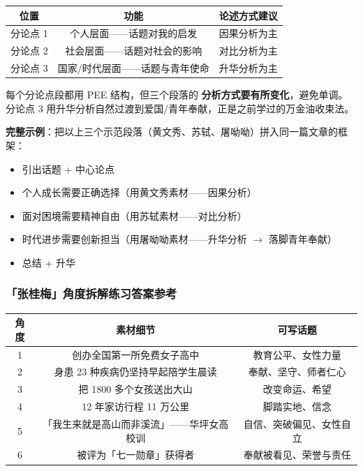 \begin{center}
\begin{tabular}{c|c|c}
\textbf{位置} & \textbf{功能} & \textbf{论述方式建议} \\ \hline
分论点 1 & 个人层面——话题对我的启发 & 因果分析为主 \\
分论点 2 & 社会层面——话题对社会的影响 & 对比分析为主 \\
分论点 3 & 国家/时代层面——话题与青年使命 & 升华分析为主 \\
\end{tabular}
\end{center}

每个分论点段都用 PEE 结构，但三个段落的 \textbf{分析方式要有所变化}，避免单调。分论点 3 用升华分析自然过渡到爱国/青年奉献，正是之前学过的万金油收束法。

\textbf{完整示例}：把以上三个示范段落（黄文秀、苏轼、屠呦呦）拼入同一篇文章的框架：

\begin{itemize}
  \item[\textbf{开头}] 引出话题 + 中心论点
  \item[\textbf{分论点 1}] 个人成长需要正确选择（用黄文秀素材——因果分析）
  \item[\textbf{分论点 2}] 面对困境需要精神自由（用苏轼素材——对比分析）
  \item[\textbf{分论点 3}] 时代进步需要创新担当（用屠呦呦素材——升华分析 $\to$ 落脚青年奉献）
  \item[\textbf{结尾}] 总结 + 升华
\end{itemize}

\subsubsection{「张桂梅」角度拆解练习答案参考}

\begin{center}
\begin{tabular}{c|c|c}
\textbf{角度} & \textbf{素材细节} & \textbf{可写话题} \\ \hline
1 & 创办全国第一所免费女子高中 & 教育公平、女性力量 \\
2 & 身患 23 种疾病仍坚持早起陪学生晨读 & 奉献、坚守、师者仁心 \\
3 & 把 1800 多个女孩送出大山 & 改变命运、希望 \\
4 & 12 年家访行程 11 万公里 & 脚踏实地、信念 \\
5 & 「我生来就是高山而非溪流」——华坪女高校训 & 自信、突破偏见、女性自立 \\
6 & 被评为「七一勋章」获得者 & 奉献被看见、荣誉与责任 \\
\end{tabular}
\end{center}

